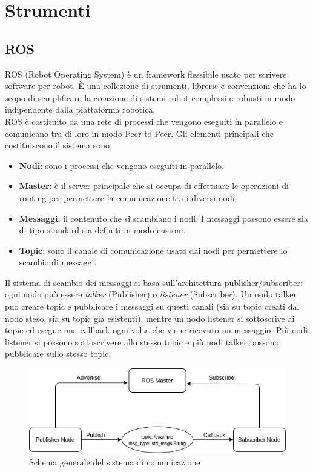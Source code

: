 \chapter{Strumenti}

\section{ROS}

ROS (Robot Operating System) è un framework flessibile usato per scrivere software per robot.
È una collezione di strumenti, librerie e convenzioni che ha lo scopo di semplificare la creazione di sistemi robot complessi e robusti in modo indipendente dalla piattaforma robotica. \\
ROS è costituito da una rete di processi che vengono eseguiti in parallelo e comunicano tra di loro in modo Peer-to-Peer.
Gli elementi principali che costituiscono il sistema sono:
\begin{itemize}
  \item \textbf{Nodi}: sono i processi che vengono eseguiti in parallelo.
  \item \textbf{Master}: è il server principale che si occupa di effettuare le operazioni di routing per permettere la comunicazione tra i diversi nodi.
  \item \textbf{Messaggi}: il contenuto che si scambiano i nodi. I messaggi possono essere sia di tipo standard sia definiti in modo custom.
  \item \textbf{Topic}: sono il canale di comunicazione usato dai nodi per permettere lo scambio di messaggi.
\end{itemize}
Il sistema di scambio dei messaggi si basa sull'architettura publisher/subscriber: ogni nodo può essere \textit{talker} (Publisher) o \textit{listener}  (Subscriber).
Un nodo talker può creare topic e pubblicare i messaggi su questi canali (sia su topic creati dal nodo steso, sia su topic già esistenti), mentre un nodo listener si sottoscrive ai topic ed esegue una callback ogni volta che viene ricevuto un messaggio. Più nodi listener si possono sottoscrivere allo stesso topic e più nodi talker possono pubblicare sullo stesso topic.

\begin{figure}[H]
\centering
\includegraphics[scale=0.8]{images/ros_system.png}
\caption{Schema generale del sistema di comunicazione}
\end{figure}

